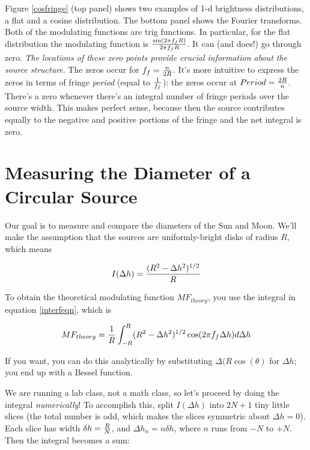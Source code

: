 \documentclass[11pt,preprint]{aastex}
\begin{document}
Figure \ref{cosfringe} (top panel) shows two examples of 1-d brightness
distributions, a flat and a cosine distribution.  The bottom panel shows
the Fourier transforms.  Both of the modulating functions are trig
functions. In particular, for the flat distribution the modulating
function is ${ \sin(2 \pi f_f R) \over 2 \pi f_f R}$. It can (and does!)
go through zero. {\it The locations of these zero points provide crucial
information about the source structure}. The zeros occur for $f_f={n
\over 2R}$. It's more intuitive to express the zeros in terms of fringe
{\it period} (equal to $1 \over f_f$): the zeros occur at $Period = {2R
\over n}$. There's a zero whenever there's an integral number of fringe
periods over the source width. This makes perfect sense, because then
the source contributes equally to the negative and positive portions of
the fringe and the net integral is zero.


\section{Measuring the Diameter of a Circular Source}

\noindent
Our goal is to measure and compare the diameters of the Sun and
Moon. We'll make the assumption that the sources are uniformly-bright
disks of radius $R$, which means

\begin{equation}
I(\Delta h) = { (R^2 - \Delta h^2)^{1/2} \over  R}
\end{equation}

\noindent To obtain the theoretical modulating function $MF_{theory}$, you use the integral in
equation \ref{interfeqn}, which is

\begin{equation}
MF_{theory} = {1 \over R} \int_{-R}^R (R^2 - \Delta h^2)^{1/2} 
	\cos(2\pi f_f \Delta h) d \Delta h
\end{equation}

\noindent If you want, you can do this analytically by substituting
$\Delta (R \cos (\theta)$ for $\Delta h$; you end up with a Bessel
function.

We are running a lab class, not a math class, so let's proceed by doing
the integral {\it numerically}! To accomplish this, split $I(\Delta h)$
into $2N + 1$ tiny little slices (the total number is odd, which makes
the slices symmetric about $\Delta h = 0$). Each slice has width $\delta
h = {R \over N}$, and $\Delta h_n = n \delta h$, where $n$ runs from
$-N$ to $+N$. Then the integral becomes a sum:
\end{document}
